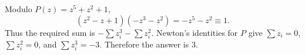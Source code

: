 Modulo $P(z)=z^5+z^2+1$,
\[
(z^2-z+1)(-z^3-z^2)=-z^5-z^2\equiv1.
\]
Thus the required sum is $-\sum z_i^3-\sum z_i^2$. Newton's identities for $P$ give $\sum z_i=0$, $\sum z_i^2=0$, and $\sum z_i^3=-3$. Therefore the answer is $\boxed3$.
